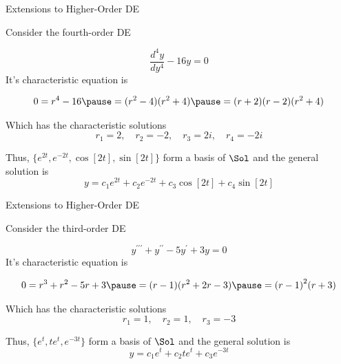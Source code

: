 \documentclass{beamer}
\begin{document}
\begin{frame}{Extensions to Higher-Order DE}
\begin{example}
Consider the fourth-order DE

\vspace{-1mm}
\begin{equation*}
\dfrac{d^4 y}{dy^4}-16y=0
\end{equation*}\pause
It's characteristic equation is

\vspace{-1mm}
\begin{equation*}
\begin{aligned}
0=r^4-16\pause
=(r^2-4)(r^2+4)\pause
=(r+2)(r-2)(r^2+4)
\end{aligned}
\end{equation*}\pause

\vspace{-3mm}
Which has the characteristic solutions
\begin{equation*}
r_1 = 2  , \quad r_2  = -2 , \quad r_3 = 2i , \quad r_4  = -2i
\end{equation*}\pause

\vspace{-3mm}
Thus, $\{e^{2t},e^{-2t},\cos[2t],\sin[2t]\}$ form a basis of $\Sol$ and the general solution is
\begin{equation*}
y=c_1e^{2t}+c_2e^{-2t}+c_3\cos[2t]+c_4\sin[2t]
\end{equation*}
\end{example}
\end{frame}

\begin{frame}{Extensions to Higher-Order DE}
\begin{example}
Consider the third-order DE

\vspace{-1mm}
\begin{equation*}
y^{\prime\prime\prime}+y^{\prime\prime}-5y^{\prime}+3y=0
\end{equation*}\pause
It's characteristic equation is

\vspace{-1mm}
\begin{equation*}
\begin{aligned}
0=r^3+r^2-5r+3\pause
=(r-1)(r^2+2r-3)\pause
={(r-1)}^2(r+3)
\end{aligned}
\end{equation*}\pause

\vspace{-3mm}
Which has the characteristic solutions
\begin{equation*}
r_1=1, \quad r_2=1, \quad r_3=-3
\end{equation*}\pause

\vspace{-3mm}
Thus, $\{e^{t},te^{t},e^{-3t}\}$ form a basis of $\Sol$ and the general solution is
\begin{equation*}
y=c_1e^{t}+c_2te^{t}+c_3e^{-3t}
\end{equation*}
\end{example}
\end{frame}
\end{document}

